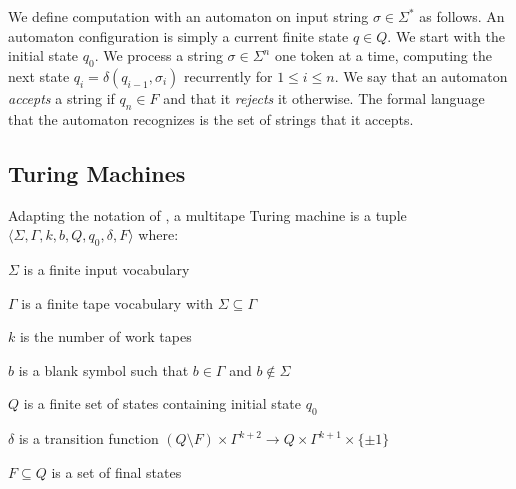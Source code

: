 We define computation with an automaton on input string $\sigma \in \Sigma^*$ as follows.
An automaton configuration is simply a current finite state $q \in Q$.
We start with the initial state $q_0$.
We process a string $\sigma \in \Sigma^n$ one token at a time, computing the next state $q_i = \delta(q_{i-1}, \sigma_i)$ recurrently for $1 \leq i \leq n$.
We say that an automaton \emph{accepts} a string if $q_n \in F$ and that it \emph{rejects} it otherwise. The formal language that the automaton recognizes is the set of strings that it accepts.

\subsection{Turing Machines}

Adapting the notation of \citet{hopcroft2001introduction}, a multitape Turing machine is a tuple $\langle \Sigma, \Gamma,k, b, Q, q_0, \delta, F \rangle$ where:

\begin{compactenum}
    \item $\Sigma$ is a finite input vocabulary
    \item $\Gamma$ is a finite tape vocabulary with $\Sigma \subseteq \Gamma$
    \item $k$ is the number of work tapes
    \item $b$ is a blank symbol such that $b \in \Gamma$ and $b \not\in \Sigma$
    \item $Q$ is a finite set of states containing initial state $q_0$
    \item $\delta$ is a transition function $(Q \setminus F) \times \Gamma^{k+2} \to Q \times \Gamma^{k+1} \times \{\pm 1\}$
    \item $F \subseteq Q$ is a set of final states
\end{compactenum}

